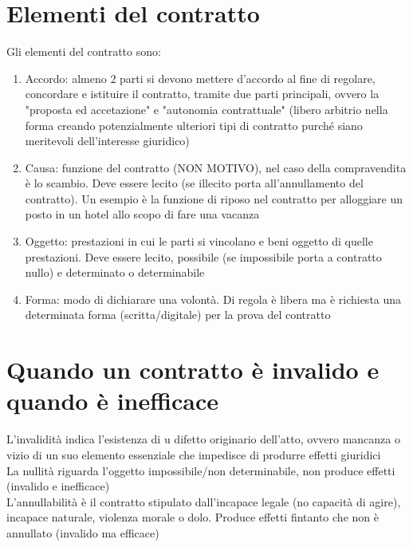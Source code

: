 \documentclass[8pt,oneside,a4paper]{article}
\begin{document}
	\section{Elementi del contratto}
	Gli elementi del contratto sono:
	\begin{enumerate}
		\item Accordo: almeno 2 parti si devono mettere d'accordo al fine di regolare, concordare e istituire il contratto, tramite due parti principali, ovvero la "proposta ed accetazione" e "autonomia contrattuale" (libero arbitrio nella forma creando potenzialmente ulteriori tipi di contratto purché siano meritevoli dell'interesse giuridico)
		\item Causa: funzione del contratto (NON MOTIVO), nel caso della compravendita è lo scambio. Deve essere lecito (se illecito porta all'annullamento del contratto). Un esempio è la funzione di riposo nel contratto per alloggiare un posto in un hotel allo scopo di fare una vacanza
		\item Oggetto: prestazioni in cui le parti si vincolano e beni oggetto di quelle prestazioni. Deve essere lecito, possibile (se impossibile porta a contratto nullo) e determinato o determinabile
		\item Forma: modo di dichiarare una volontà. Di regola è libera ma è richiesta una determinata forma (scritta/digitale) per la prova del contratto
	\end{enumerate}
	\section{Quando un contratto è invalido e quando è inefficace}
	L'invalidità indica l'esistenza di u difetto originario dell'atto, ovvero mancanza o vizio di un suo elemento essenziale che impedisce di produrre effetti giuridici\\
	La nullità riguarda l'oggetto impossibile/non determinabile, non produce effetti (invalido e inefficace)\\
	L'annullabilità è il contratto stipulato dall'incapace legale (no capacità di agire), incapace naturale, violenza morale o dolo. Produce effetti fintanto che non è annullato (invalido ma efficace)
\end{document}
